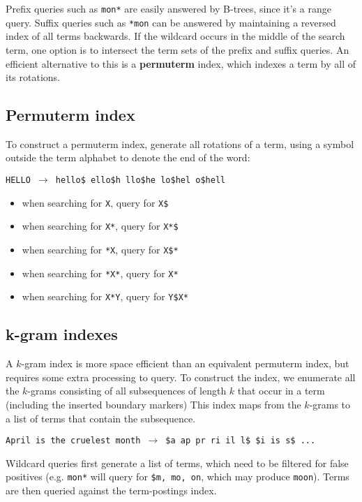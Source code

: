 \documentclass{idc_msc}
\begin{document}
Prefix queries such as \texttt{mon*} are easily answered by B-trees, since it's a range query.
Suffix queries such as \texttt{*mon} can be answered by maintaining a reversed index of all terms backwards.
If the wildcard occurs in the middle of the search term, one option is to intersect the term sets of the prefix and suffix queries.
An efficient alternative to this is a \textbf{permuterm} index, which indexes a term by all of its rotations.

\subsection{Permuterm index}

To construct a permuterm index, generate all rotations of a term, using a symbol outside the term alphabet to denote the end of the word:

\texttt{HELLO \(\to\) hello\$ ello\$h llo\$he lo\$hel o\$hell}

\begin{itemize}
  \item when searching for \texttt{X}, query for \texttt{X\$}
  \item when searching for \texttt{X*}, query for \texttt{X*\$}
  \item when searching for \texttt{*X}, query for \texttt{X\$*}
  \item when searching for \texttt{*X*}, query for \texttt{X*}
  \item when searching for \texttt{X*Y}, query for \texttt{Y\$X*}
\end{itemize}

\subsection{k-gram indexes}

A \(k\)-gram index is more space efficient than an equivalent permuterm index, but requires some extra processing to query.
To construct the index, we enumerate all the \(k\)-grams consisting of all subsequences of length \(k\) that occur in a term (including the inserted boundary markers)
This index maps from the \(k\)-grams to a list of terms that contain the subsequence.

\texttt{April is the cruelest month \(\to\) \$a ap pr ri il l\$ \$i is s\$ ...}

Wildcard queries first generate a list of terms, which need to be filtered for false positives (e.g. \texttt{mon*} will query for \texttt{\$m, mo, on}, which may produce \texttt{moon}).
Terms are then queried against the term-postings index.
\end{document}

